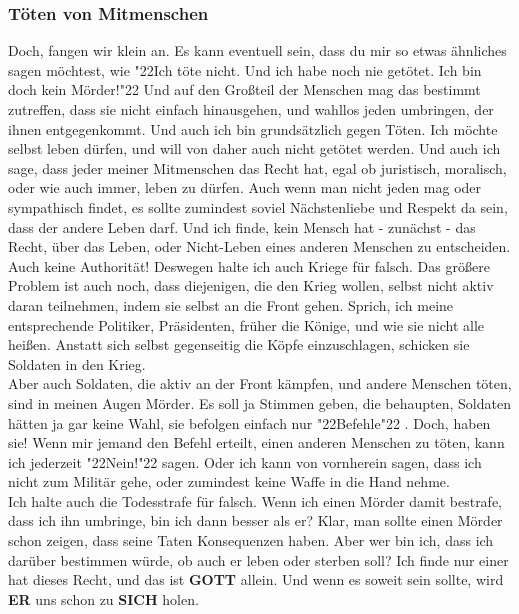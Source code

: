 \documentclass[10pt,a5paper]{article}
\newcommand{\Er}[0]{\textbf{ER}}
\newcommand{\Gott}[0]{\textbf{GOTT}}
\newcommand{\Sich}[0]{\textbf{SICH}}
\newcommand{\q}[1]{\char"22{#1}\char"22 }
\begin{document}
	\subsubsection{T\"oten von Mitmenschen}
		Doch, fangen wir klein an.
		Es kann eventuell sein,
		dass du mir so etwas \"ahnliches sagen m\"ochtest,
		wie \q{Ich t\"ote nicht.
		Und ich habe noch nie get\"otet.
		Ich bin doch kein M\"order!}
		Und auf den Gro{\ss}teil der Menschen mag das bestimmt zutreffen,
		dass sie nicht einfach hinausgehen,
		und wahllos jeden umbringen,
		der ihnen entgegenkommt.
		Und auch ich bin grunds\"atzlich gegen T\"oten.
		Ich m\"ochte selbst leben d\"urfen,
		und will von daher auch nicht get\"otet werden.
		Und auch ich sage,
		dass jeder meiner Mitmenschen das Recht hat,
		egal ob juristisch,
		moralisch,
		oder wie auch immer,
		leben zu d\"urfen.
		Auch wenn man nicht jeden mag oder sympathisch findet,
		es sollte zumindest soviel N\"achstenliebe und Respekt da sein,
		dass der andere Leben darf.
		Und ich finde,
		kein Mensch hat - zun\"achst - das Recht,
		\"uber das Leben,
		oder Nicht-Leben eines anderen Menschen zu entscheiden.
		\\
		Auch keine Authorit\"at!
		Deswegen halte ich auch Kriege f\"ur falsch.
		Das gr\"o{\ss}ere Problem ist auch noch,
		dass diejenigen,
		die den Krieg wollen,
		selbst nicht aktiv daran teilnehmen,
		indem sie selbst an die Front gehen.
		Sprich,
		ich meine entsprechende Politiker,
		Pr\"asidenten,
		fr\"uher die K\"onige,
		und wie sie nicht alle hei{\ss}en.
		Anstatt sich selbst gegenseitig die K\"opfe einzuschlagen,
		schicken sie Soldaten in den Krieg.
		\\
		Aber auch Soldaten,
		die aktiv an der Front k\"ampfen,
		und andere Menschen t\"oten,
		sind in meinen Augen M\"order.
		Es soll ja Stimmen geben,
		die behaupten,
		Soldaten h\"atten ja gar keine Wahl,
		sie befolgen einfach nur \q{Befehle}.
		Doch, haben sie!
		Wenn mir jemand den Befehl erteilt,
		einen anderen Menschen zu t\"oten,
		kann ich jederzeit \q{Nein!} sagen.
		Oder ich kann von vornherein sagen,
		dass ich nicht zum Milit\"ar gehe,
		oder zumindest keine Waffe in die Hand nehme.
		\\
		Ich halte auch die Todesstrafe f\"ur falsch.
		Wenn ich einen M\"order damit bestrafe,
		dass ich ihn umbringe,
		bin ich dann besser als er?
		Klar,
		man sollte einen M\"order schon zeigen,
		dass seine Taten Konsequenzen haben.
		Aber wer bin ich,
		dass ich dar\"uber bestimmen w\"urde,
		ob auch er leben oder sterben soll?
		Ich finde nur einer hat dieses Recht,
		und das ist {\Gott} allein.
		Und wenn es soweit sein sollte,
		wird {\Er} uns schon zu {\Sich} holen.
		
\end{document}
